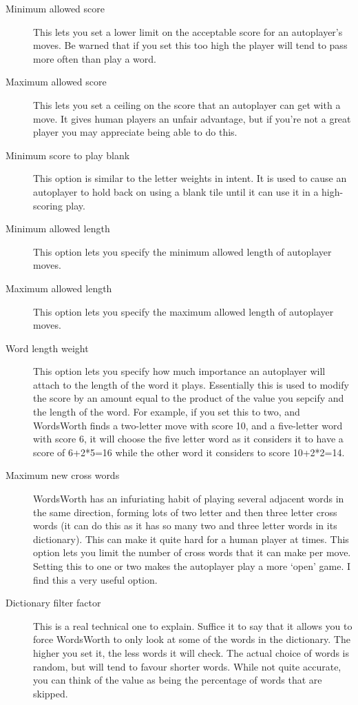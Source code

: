 \begin{description}
\item [Minimum allowed score] This lets you set a lower limit on
the acceptable score for an autoplayer's moves. Be warned that if
you set this too high the player will tend to pass more often than
play a word.
\item [Maximum allowed score] This lets you set a ceiling on the
score that an autoplayer can get with a move. It gives human players
an unfair advantage, but if you're not a great player you may 
appreciate being able to do this.
\item [Minimum score to play blank] This option is similar to the
letter weights in intent. It is used to cause an autoplayer to
hold back on using a blank tile until it can use it in a high-scoring
play.
\item [Minimum allowed length] This option lets you specify the
minimum allowed length of autoplayer moves.
\item [Maximum allowed length] This option lets you specify the
maximum allowed length of autoplayer moves.
\item [Word length weight] This option lets you specify how
much importance an autoplayer will attach to the length of the
word it plays. Essentially this is used to modify the score by
an amount equal to the product of the value you sepcify and the
length of the word. For example, if you set this to two, and 
WordsWorth finds a two-letter move with score 10, and a five-letter
word with score 6, it will choose the five letter word as it
considers it to have a score of 6+2*5=16 while the other word
it considers to score 10+2*2=14.
\item [Maximum new cross words] WordsWorth has an infuriating
habit of playing several adjacent words in the same direction,
forming lots of two letter and then three letter cross words
(it can do this as it has so many two and three letter words
in its dictionary). This can make it quite hard for a human 
player at times. This option lets you limit the number of cross
words that it can make per move. Setting this to one or two 
makes the autoplayer play a more `open' game. I find this a
very useful option.

\item [Dictionary filter factor] This is a real technical one
to explain. Suffice it to say that it allows you to force WordsWorth
to only look at some of the words in the dictionary. The higher
you set it, the less words it will check. The actual choice of
words is random, but will tend to favour shorter words. While
not quite accurate, you can think of the value as being the
percentage of words that are skipped.


\end{description}
